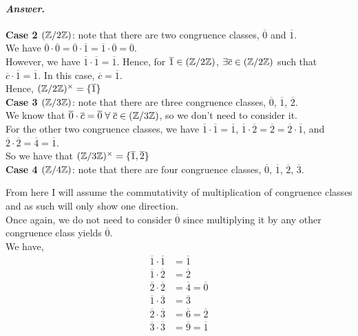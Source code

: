 \documentclass[11pt, reqno]{amsart}
\theoremstyle{plain}
\theoremstyle{definition}
\theoremstyle{example}
\newenvironment{ans}{\color{black}\medskip \paragraph*{\emph{Answer}.}}{\hfill \break  $~\!\!$ \dotfill \medskip }
\begin{document}
\begin{enumerate}[1.]
\begin{enumerate}
\begin{ans}
\textbf{Case 2 $(\mathbb{Z}/2\mathbb{Z})$}: note that there are two congruence classes, $\overline{0}$ and $\overline{1}$.\\

We have $\overline{0} \cdot \overline{0} = \overline{0} \cdot \overline{1} = \overline{1} \cdot \overline{0} = \overline{0}$.\\

However, we have $\overline{1} \cdot \overline{1} = \overline{1}$. Hence, for $\overline{1} \in (\mathbb{Z}/2\mathbb{Z})$, $\exists \overline{c} \in (\mathbb{Z}/2\mathbb{Z})$ such that $\overline{c} \cdot \overline{1} = \overline{1}$. In this case, $\overline{c} = \overline{1}$.\\

Hence, $(\mathbb{Z}/2\mathbb{Z})^{\times} = \{\overline{1}\}$\\

\textbf{Case 3 $(\mathbb{Z}/3\mathbb{Z})$}: note that there are three congruence classes, $\overline{0}$, $\overline{1}$, $\overline{2}$.\\

We know that $\overline{0} \cdot \overline{c} = \overline{0} \; \forall \; \overline{c} \in (\mathbb{Z}/3\mathbb{Z})$, so we don't need to consider it.\\

For the other two congruence classes, we have $\overline{1} \cdot \overline{1} = \overline{1}$, $\overline{1} \cdot \overline{2} = \overline{2} = \overline{2} \cdot \overline{1}$, and $\overline{2} \cdot \overline{2} = \overline{4} = \overline{1}$.\\

So we have that $(\mathbb{Z}/3\mathbb{Z})^{\times} = \{\overline{1}, \overline{2}\}$\\

\newpage
\textbf{Case 4 $(\mathbb{Z}/4\mathbb{Z})$}: note that there are four congruence classes, $\overline{0}$, $\overline{1}$, $\overline{2}$, $\overline{3}$.

From here I will assume the commutativity of multiplication of congruence classes and as such will only show one direction.\\

Once again, we do not need to consider $\overline{0}$ since multiplying it by any other congruence class yields $\overline{0}$.\\

We have,
\begin{align*}
\overline{1} \cdot \overline{1} &= \overline{1}\\
\overline{1} \cdot \overline{2} &= \overline{2}\\
\overline{2} \cdot \overline{2} &= \overline{4} = \overline{0}\\
\overline{1} \cdot \overline{3} &= \overline{3}\\
\overline{2} \cdot \overline{3} &= \overline{6} = \overline{2}\\
\overline{3} \cdot \overline{3} &= \overline{9} = \overline{1}
\end{align*}


\end{ans}
\end{enumerate}
\end{enumerate}
\end{document}
